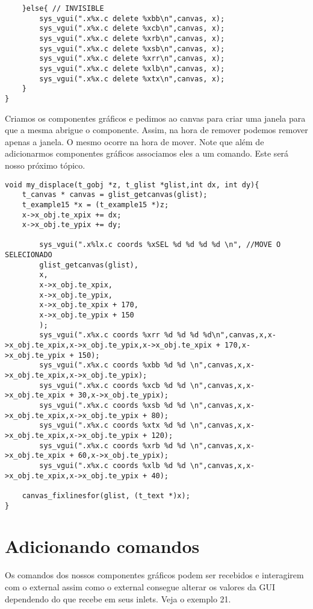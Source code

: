 \begin{lstlisting}
	}else{ // INVISIBLE
		sys_vgui(".x%x.c delete %xbb\n",canvas, x);
		sys_vgui(".x%x.c delete %xcb\n",canvas, x);
		sys_vgui(".x%x.c delete %xrb\n",canvas, x);
		sys_vgui(".x%x.c delete %xsb\n",canvas, x);
		sys_vgui(".x%x.c delete %xrr\n",canvas, x);
		sys_vgui(".x%x.c delete %xlb\n",canvas, x);
		sys_vgui(".x%x.c delete %xtx\n",canvas, x);
	}
}
\end{lstlisting}

Criamos os componentes gráficos e pedimos ao canvas para criar uma janela para que a mesma abrigue o componente.
Assim, na hora de remover podemos remover apenas a janela. O mesmo ocorre na hora de mover.
Note que além de adicionarmos componentes gráficos associamos eles a um comando. Este será nosso próximo tópico.

\begin{lstlisting}
void my_displace(t_gobj *z, t_glist *glist,int dx, int dy){
	t_canvas * canvas = glist_getcanvas(glist);
	t_example15 *x = (t_example15 *)z;
	x->x_obj.te_xpix += dx;
	x->x_obj.te_ypix += dy;

        sys_vgui(".x%lx.c coords %xSEL %d %d %d %d \n", //MOVE O SELECIONADO
		glist_getcanvas(glist),
		x,
		x->x_obj.te_xpix,
		x->x_obj.te_ypix,
		x->x_obj.te_xpix + 170,
		x->x_obj.te_ypix + 150
		);
        sys_vgui(".x%x.c coords %xrr %d %d %d %d\n",canvas,x,x->x_obj.te_xpix,x->x_obj.te_ypix,x->x_obj.te_xpix + 170,x->x_obj.te_ypix + 150);
        sys_vgui(".x%x.c coords %xbb %d %d \n",canvas,x,x->x_obj.te_xpix,x->x_obj.te_ypix);
        sys_vgui(".x%x.c coords %xcb %d %d \n",canvas,x,x->x_obj.te_xpix + 30,x->x_obj.te_ypix);
        sys_vgui(".x%x.c coords %xsb %d %d \n",canvas,x,x->x_obj.te_xpix,x->x_obj.te_ypix + 80);
        sys_vgui(".x%x.c coords %xtx %d %d \n",canvas,x,x->x_obj.te_xpix,x->x_obj.te_ypix + 120);
        sys_vgui(".x%x.c coords %xrb %d %d \n",canvas,x,x->x_obj.te_xpix + 60,x->x_obj.te_ypix);
        sys_vgui(".x%x.c coords %xlb %d %d \n",canvas,x,x->x_obj.te_xpix,x->x_obj.te_ypix + 40);

	canvas_fixlinesfor(glist, (t_text *)x);
}
\end{lstlisting}

\section{Adicionando comandos}

Os comandos dos nossos componentes gráficos podem ser recebidos e interagirem com o external assim como o
external consegue alterar os valores da GUI dependendo do que recebe em seus inlets. Veja o exemplo 21.

